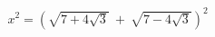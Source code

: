 \documentclass[preview]{standalone}
\begin{document}
\begin{align*}
x^2 = \left(\sqrt{7 + 4  \sqrt{3}} \ + \ \sqrt{7 - 4  \sqrt{3}}\right)^2
\end{align*}
\end{document}
